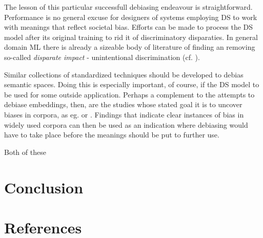 \documentclass{article}
\begin{document}
The lesson of this particular successfull debiasing endeavour is straightforward. Performance is no general excuse for designers of systems employing DS to work with meanings that reflect societal bias. Efforts can be made to process the DS model after its original training to rid it of discriminatory disparaties. In general domain ML there is already a sizeable body of literature of finding an removing so-called \emph{disparate impact} - unintentional discrimination (cf. \cite{feldman2015certifying} \cite{dwork2012fairness}). 

Similar collections of standardized techniques should be developed to debias semantic spaces. Doing this is especially important, of course, if the DS model to be used for some outside application. 
Perhaps a complement to the attempts to debiase embeddings, then, are the studies whose stated goal it is to uncover biases in corpora, as eg. \cite{wagner2015s} or \cite{herbelot2012distributional}. Findings that indicate clear instances of bias in widely used corpora can then be used as an indication where  debiasing would have to take place before the meanings should be put to further use.

Both of these




\section{Conclusion}\hypertarget{sec x}{}

\section{References}\hypertarget{sec5}{ }
\end{document}
